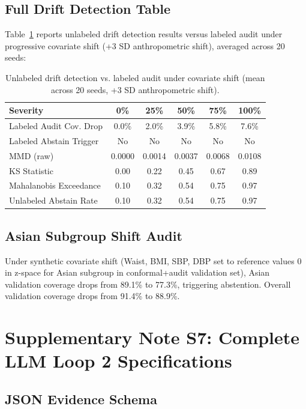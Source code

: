 \documentclass[11pt,a4paper]{article}
\theoremstyle{plain}
\begin{document}
\subsection{Full Drift Detection Table}

Table~\ref{tab:full_drift} reports unlabeled drift detection results versus labeled audit under progressive covariate shift (+3 SD anthropometric shift), averaged across 20 seeds:

\begin{table}[htbp]
\centering
\caption{Unlabeled drift detection vs. labeled audit under covariate shift (mean across 20 seeds, +3 SD anthropometric shift).}
\label{tab:full_drift}
\begin{tabular}{lccccc}
\toprule
Severity & 0\% & 25\% & 50\% & 75\% & 100\% \\
\midrule
Labeled Audit Cov. Drop & 0.0\% & 2.0\% & 3.9\% & 5.8\% & 7.6\% \\
Labeled Abstain Trigger & No & No & No & No & No \\
MMD (raw) & 0.0000 & 0.0014 & 0.0037 & 0.0068 & 0.0108 \\
KS Statistic & 0.00 & 0.22 & 0.45 & 0.67 & 0.89 \\
Mahalanobis Exceedance & 0.10 & 0.32 & 0.54 & 0.75 & 0.97 \\
Unlabeled Abstain Rate & 0.10 & 0.32 & 0.54 & 0.75 & 0.97 \\
\bottomrule
\end{tabular}
\end{table}

\subsection{Asian Subgroup Shift Audit}

Under synthetic covariate shift (Waist, BMI, SBP, DBP set to reference values 0 in z-space for Asian subgroup in conformal+audit validation set), Asian validation coverage drops from 89.1\% to 77.3\%, triggering abstention. Overall validation coverage drops from 91.4\% to 88.9\%.

\section{Supplementary Note S7: Complete LLM Loop 2 Specifications}
\label{sec:llm_ext}

\subsection{JSON Evidence Schema}
\end{document}
